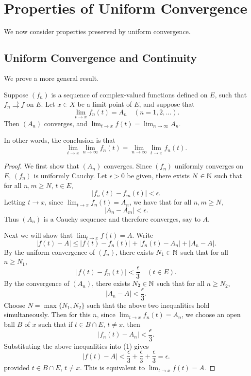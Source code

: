 \section{Properties of Uniform Convergence}
We now consider properties preserved by uniform convergence.

\subsection{Uniform Convergence and Continuity}
We prove a more general result.

\begin{proposition}
Suppose $(f_n)$ is a sequence of complex-valued functions defined on $E$, such that $f_n\rightrightarrows f$ on $E$. Let $x\in X$ be a limit point of $E$, and suppose that
\[\lim_{t\to x}f_n(t)=A_n\quad(n=1,2,\dots).\]
Then $(A_n)$ converges, and $\displaystyle\lim_{t\to x}f(t)=\lim_{n\to\infty}A_n$.
\end{proposition}

In other words, the conclusion is that
\[\lim_{t\to x}\lim_{n\to\infty}f_n(t)=\lim_{n\to\infty}\lim_{t\to x}f_n(t).\]

\begin{proof}
We first show that $(A_n)$ converges. Since $(f_n)$ uniformly converges on $E$, $(f_n)$ is uniformly Cauchy. Let $\epsilon>0$ be given, there exists $N\in\mathbb N$ such that for all $n,m\ge N$, $t\in E$,
\[|f_n(t)-f_m(t)|<\epsilon.\]
Letting $t\to x$, since $\displaystyle\lim_{t\to x}f_n(t)=A_n$, we have that for all $n,m\ge N$,
\[|A_n-A_m|<\epsilon.\]
Thus $(A_n)$ is a Cauchy sequence and therefore converges, say to $A$.

Next we will show that $\displaystyle\lim_{t\to x}f(t)=A$. Write
\begin{equation*}\tag{1}
|f(t)-A|\le|f(t)-f_n(t)|+|f_n(t)-A_n|+|A_n-A|.
\end{equation*}
By the uniform convergence of $(f_n)$, there exists $N_1\in\mathbb N$ such that for all $n\ge N_1$,
\[|f(t)-f_n(t)|<\frac{\epsilon}{3}\quad(t\in E).\]
By the convergence of $(A_n)$, there exists $N_2\in\mathbb N$ such that for all $n\ge N_2$,
\[|A_n-A|<\frac{\epsilon}{3}.\]
Choose $N=\max\{N_1,N_2\}$ such that the above two inequalities hold simultaneously. 
Then for this $n$, since $\displaystyle\lim_{t\to x}f_n(t)=A_n$, we choose an open ball $B$ of $x$ such that if $t\in B\cap E$, $t\neq x$, then
\[|f_n(t)-A_n|<\frac{\epsilon}{3}.\]
Substituting the above inequalities into (1) gives
\[|f(t)-A|<\frac{\epsilon}{3}+\frac{\epsilon}{3}+\frac{\epsilon}{3}=\epsilon.\]
provided $t\in B\cap E$, $t\neq x$. This is equivalent to $\displaystyle\lim_{t\to x}f(t)=A$.
\end{proof}

